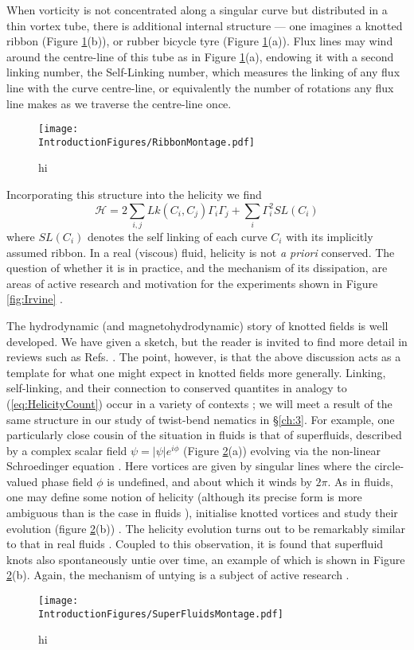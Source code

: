 When vorticity is not concentrated along a singular curve but distributed in a thin vortex tube, there is additional internal structure --- one imagines a knotted ribbon (Figure \ref{fig:RibbonMontage}(b)), or rubber bicycle tyre (Figure \ref{fig:RibbonMontage}(a)). Flux lines may wind around the centre-line of this tube as in Figure \ref{fig:RibbonMontage}(a), endowing it with a second linking number, the Self-Linking number, which measures the linking of any flux line with the curve centre-line, or equivalently the number of rotations any flux line makes as we traverse the centre-line once. 
\begin{figure}[htbp]
\centering
\texttt{[image: \\IntroductionFigures/RibbonMontage.pdf]}
\caption{hi }
\label{fig:RibbonMontage}
\end{figure}
Incorporating this structure into the helicity we find \cite{MoffatRicca}
\begin{equation}
    \mathcal{H} = 2\sum_{i,j} Lk(C_i,C_j) \Gamma_i \Gamma_j + \sum_{i} \Gamma_i^2 SL(C_i) 
    \label{eq:HelicityCount}
\end{equation}
where $SL(C_i)$ denotes the self linking of each curve $C_i$ with its implicitly assumed ribbon. In a real (viscous) fluid, helicity is not \emph{a priori} conserved. The question of whether it is in practice, and the mechanism of its dissipation, are areas of active research and motivation for the experiments shown in Figure \ref{fig:Irvine} \cite{Klecker}. 

The hydrodynamic (and magnetohydrodynamic) story of knotted fields is well developed. We have given a sketch, but the reader is invited to find more detail in reviews such as Refs. \cite{Moffat, Irvine}. The point, however, is that the above discussion acts as a template for what one might expect in knotted fields more generally. Linking, self-linking, and their connection to conserved quantites in analogy to (\ref{eq:HelicityCount}) occur in a variety of contexts \cite{Winfree}; we will meet a result of the same structure in our study of twist-bend nematics in \S \ref{ch:3}. For example, one particularly close cousin of the situation in fluids is that of superfluids, described by a complex scalar field $\psi = |\psi| e^{i \phi}$ (Figure \ref{fig:SuperFluidMontage}(a)) evolving via the non-linear Schroedinger equation \cite{}. Here vortices are given by singular lines where the circle-valued phase field $\phi$ is undefined, and about which it winds by $2\pi$. As in fluids, one may define some notion of helicity (although its precise form is more ambiguous than is the case in fluids \cite{Salman}), initialise knotted vortices and study their evolution (figure \ref{fig:SuperFluidMontage}(b)) \cite{Scheeler}. The helicity evolution turns out to be remarkably similar to that in real fluids \cite{Scheeler}. Coupled to this observation, it is found that superfluid knots also spontaneously untie over time, an example of which is shown in Figure \ref{fig:SuperFluidMontage}(b). Again, the mechanism of untying is a subject of active research \cite{Scheeler}.
\begin{figure}[htbp]
\centering
\texttt{[image: \\IntroductionFigures/SuperFluidsMontage.pdf]}
\caption{hi }
\label{fig:SuperFluidMontage}
\end{figure}
